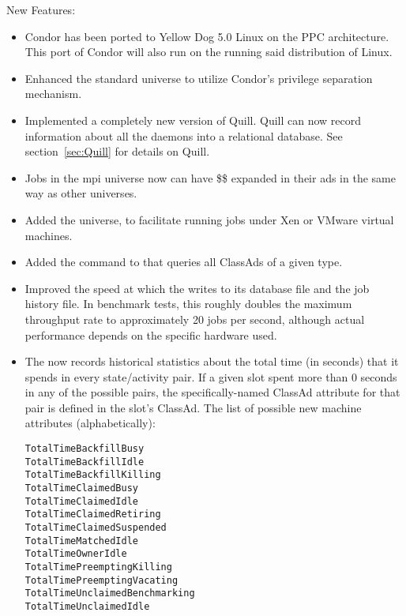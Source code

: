 \noindent New Features:

\begin{itemize}

\item Condor has been ported to Yellow Dog 5.0 Linux on the
PPC architecture. This port of Condor will also run on the
 running said distribution of Linux.

\item Enhanced the standard universe to utilize Condor's privilege separation
mechanism.

\item Implemented a completely new version of Quill.  Quill can now
record information about all the daemons into a relational database.
See section~\ref{sec:Quill} for details on Quill.

\item Jobs in the mpi universe now can have \$\$ expanded in their
ads in the same way as other universes.

\item Added the  universe, to facilitate
running jobs under Xen or VMware virtual machines.

\item Added the  command to  that queries all
ClassAds of a given type.

\item Improved the speed at which the  writes to its database
file  and the job history file.  In benchmark tests,
this roughly doubles the maximum throughput rate to approximately 
20 jobs per second, although actual
performance depends on the specific hardware used.

\item The  now records historical statistics about the
  total time (in seconds) that it spends in every state/activity pair.
  If a given slot spent more than 0 seconds in any of the possible
  pairs, the specifically-named ClassAd attribute for that
  pair is defined in the slot's ClassAd.
  The list of possible new machine attributes (alphabetically):
\begin{verbatim}
TotalTimeBackfillBusy
TotalTimeBackfillIdle
TotalTimeBackfillKilling
TotalTimeClaimedBusy
TotalTimeClaimedIdle
TotalTimeClaimedRetiring
TotalTimeClaimedSuspended
TotalTimeMatchedIdle
TotalTimeOwnerIdle
TotalTimePreemptingKilling
TotalTimePreemptingVacating
TotalTimeUnclaimedBenchmarking
TotalTimeUnclaimedIdle
\end{verbatim}


\end{itemize}
